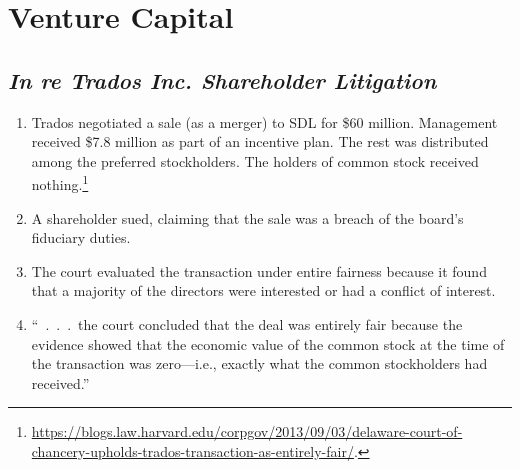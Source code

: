 \section{Venture Capital}


\subsection{\emph{In re Trados Inc. Shareholder Litigation}}

\begin{enumerate}
    \item Trados negotiated a sale (as a merger) to SDL for \$60 million. 
    Management received \$7.8 million as part of an incentive plan. The rest was 
    distributed among the preferred stockholders. The holders of common stock 
    received 
    nothing.\footnote{\url{https://blogs.law.harvard.edu/corpgov/2013/09/03/delaware-court-of-chancery-upholds-trados-transaction-as-entirely-fair/}.}
    \item A shareholder sued, claiming that the sale was a breach of the board's 
    fiduciary duties.
    \item The court evaluated the transaction under entire fairness because it 
    found that a majority of the directors were interested or had a conflict of 
    interest.
    \item ``~.~.~.~the court concluded that the deal was entirely fair because 
    the evidence showed that the economic value of the common stock at the time 
    of the transaction was zero---i.e., exactly what the common stockholders had 
    received.''
\end{enumerate}
